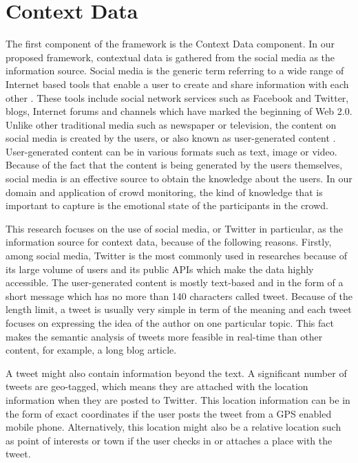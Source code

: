 \section{Context Data}
The first component of the framework is the Context Data component. In our proposed framework, contextual data is gathered from the social media as the information source. Social media is the generic term referring to a wide range of Internet based tools that enable a user to create and share information with each other \citep{kaplan2010users}. These tools include social network services such as Facebook and Twitter, blogs, Internet forums and channels which have marked the beginning of Web 2.0. Unlike other traditional media such as newspaper or television, the content on social media is created by the users, or also known as user-generated content \citep{kaplan2010users}. User-generated content can be in various formats such as text, image or video. Because of the fact that the content is being generated by the users themselves, social media is an effective source to obtain the knowledge about the users. In our domain and application of crowd monitoring, the kind of knowledge that is important to capture is the emotional state of the participants in the crowd. 

This research focuses on the use of social media, or Twitter in particular, as the information source for context data, because of the following reasons. Firstly, among social media, Twitter is the most commonly used in researches because of its large volume of users and its public APIs which make the data highly accessible. The user-generated content is mostly text-based and in the form of a short message which has no more than 140 characters called tweet. Because of the length limit, a tweet is usually very simple in term of the meaning and each tweet focuses on expressing the idea of the author on one particular topic. This fact makes the semantic analysis of tweets more feasible in real-time than other content, for example, a long blog article.

A tweet might also contain information beyond the text. A significant number of tweets are geo-tagged, which means they are attached with the location information when they are posted to Twitter. This location information can be in the form of exact coordinates if the user posts the tweet from a GPS enabled mobile phone. Alternatively, this location might also be a relative location such as point of interests or town if the user checks in or attaches a place with the tweet.

